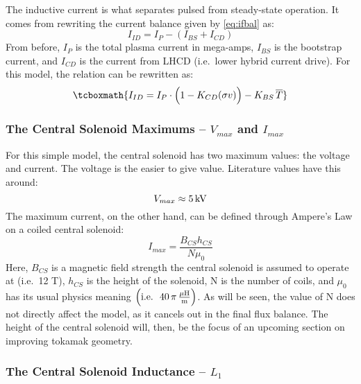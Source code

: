 The inductive current is what separates pulsed from steady-state operation. It comes from rewriting the current balance given by \cref{eq:ifbal} as:
\begin{equation}
	I_{ID} = I_P - ( I_{BS} + I_{CD} )
\end{equation}
From before, $I_P$ is the total plasma current in mega-amps, $I_{BS}$ is the bootstrap current, and $I_{CD}$ is the current from LHCD (i.e.\ lower hybrid current drive). For this model, the relation can be rewritten as:
\begin{equation}
	\tcboxmath{
	I_{ID} = I_P \cdot \Big( 1 - K_{CD} ( \sigma v ) \Big) - K_{BS} \, \overline T
	}
\end{equation}

\subsubsection{The Central Solenoid Maximums -- $V_{max}$ and $I_{max}$}

For this simple model, the central solenoid has two maximum values: the voltage and current. The voltage is the easier to give value. Literature values have this around: \cite{arc}
\begin{equation}
	V_{max} \approx 5 \, \textnormal{kV}
\end{equation}
The maximum current, on the other hand, can be defined through Ampere's Law on a coiled central solenoid: \cite{griffiths}
\begin{equation}
	I_{max} = \frac{B_{CS} h_{CS}}{N \mu_0}
\end{equation}
Here, $B_{CS}$ is a magnetic field strength the central solenoid is assumed to operate at (i.e.\ 12 T), $h_{CS}$ is the height of the solenoid, N is the number of coils, and $\mu_0$ has its usual physics meaning $\left( \textnormal{i.e.\ } \ 40 \, \pi \, \frac{ \mu \textnormal{H}}{\textnormal{m}} \right)$. As will be seen, the value of N does not directly affect the model, as it cancels out in the final flux balance. The height of the central solenoid will, then, be the focus of an upcoming section on improving tokamak geometry.

\subsubsection{The Central Solenoid Inductance -- $L_1$}

